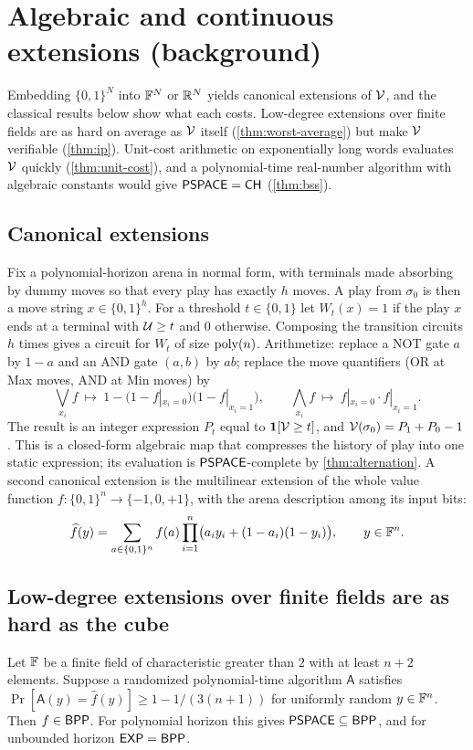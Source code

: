 \section{Algebraic and continuous extensions (background)}\label{sec:extensions}

Embedding $\{0,1\}^N$ into $\mathbb{F}^N$ or $\mathbb{R}^N$ yields canonical extensions of $\mathcal{V}$, and the classical results below show what each costs. Low-degree extensions over finite fields are as hard on average as $\mathcal{V}$ itself (\cref{thm:worst-average}) but make $\mathcal{V}$ verifiable (\cref{thm:ip}). Unit-cost arithmetic on exponentially long words evaluates $\mathcal{V}$ quickly (\cref{thm:unit-cost}), and a polynomial-time real-number algorithm with algebraic constants would give $\mathsf{PSPACE}=\mathsf{CH}$ (\cref{thm:bss}).

\subsection{Canonical extensions}
Fix a polynomial-horizon arena in normal form, with terminals made absorbing by dummy moves so that every play has exactly $h$ moves. A play from $\sigma_0$ is then a move string $x\in\{0,1\}^h$. For a threshold $t\in\{0,1\}$ let $W_t(x)=1$ if the play $x$ ends at a terminal with $\mathcal{U}\ge t$ and $0$ otherwise. Composing the transition circuits $h$ times gives a circuit for $W_t$ of size $\operatorname{poly}(n)$. Arithmetize: replace a NOT gate $a$ by $1-a$ and an AND gate $(a,b)$ by $ab$; replace the move quantifiers (OR at Max moves, AND at Min moves) by
\[
\textstyle\bigvee_{x_i}f\ \mapsto\ 1-\bigl(1-f|_{x_i=0}\bigr)\bigl(1-f|_{x_i=1}\bigr),\qquad \bigwedge_{x_i}f\ \mapsto\ f|_{x_i=0}\cdot f|_{x_i=1}.
\]
The result is an integer expression $P_t$ equal to $\mathbf{1}[\mathcal{V}\ge t]$, and $\mathcal{V}(\sigma_0)=P_1+P_0-1$. This is a closed-form algebraic map that compresses the history of play into one static expression; its evaluation is $\mathsf{PSPACE}$-complete by \cref{thm:alternation}. A second canonical extension is the multilinear extension of the whole value function $f\colon\{0,1\}^n\to\{-1,0,+1\}$, with the arena description among its input bits:
\[
\widehat f(y)=\sum_{a\in\{0,1\}^n}f(a)\prod_{i=1}^{n}\bigl(a_iy_i+(1-a_i)(1-y_i)\bigr),\qquad y\in\mathbb{F}^n.
\]

\subsection{Low-degree extensions over finite fields are as hard as the cube}

\begin{theorem}\label{thm:worst-average}
Let $\mathbb{F}$ be a finite field of characteristic greater than $2$ with at least $n+2$ elements. Suppose a randomized polynomial-time algorithm $\mathsf A$ satisfies $\Pr[\mathsf A(y)=\widehat f(y)]\ge 1-1/(3(n+1))$ for uniformly random $y\in\mathbb{F}^n$. Then $f\in\mathsf{BPP}$. For polynomial horizon this gives $\mathsf{PSPACE}\subseteq\mathsf{BPP}$, and for unbounded horizon $\mathsf{EXP}=\mathsf{BPP}$.
\end{theorem}

